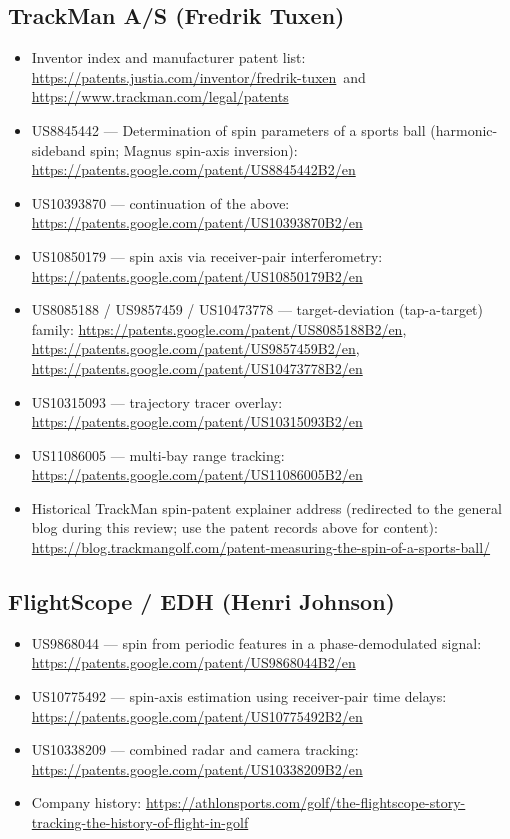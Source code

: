\subsection*{TrackMan A/S (Fredrik Tuxen)}
\begin{itemize}\small
\item Inventor index and manufacturer patent list:
  \url{https://patents.justia.com/inventor/fredrik-tuxen} \,and\,
  \url{https://www.trackman.com/legal/patents}
\item US8845442 --- Determination of spin parameters of a sports ball
  (harmonic-sideband spin; Magnus spin-axis inversion):
  \url{https://patents.google.com/patent/US8845442B2/en}
\item US10393870 --- continuation of the above:
  \url{https://patents.google.com/patent/US10393870B2/en}
\item US10850179 --- spin axis via receiver-pair interferometry:
  \url{https://patents.google.com/patent/US10850179B2/en}
\item US8085188 / US9857459 / US10473778 --- target-deviation
  (tap-a-target) family:
  \url{https://patents.google.com/patent/US8085188B2/en},
  \url{https://patents.google.com/patent/US9857459B2/en},
  \url{https://patents.google.com/patent/US10473778B2/en}
\item US10315093 --- trajectory tracer overlay:
  \url{https://patents.google.com/patent/US10315093B2/en}
\item US11086005 --- multi-bay range tracking:
  \url{https://patents.google.com/patent/US11086005B2/en}
\item Historical TrackMan spin-patent explainer address (redirected to the
  general blog during this review; use the patent records above for content):
  \url{https://blog.trackmangolf.com/patent-measuring-the-spin-of-a-sports-ball/}
\end{itemize}

\subsection*{FlightScope / EDH (Henri Johnson)}
\begin{itemize}\small
\item US9868044 --- spin from periodic features in a phase-demodulated signal:
  \url{https://patents.google.com/patent/US9868044B2/en}
\item US10775492 --- spin-axis estimation using receiver-pair time delays:
  \url{https://patents.google.com/patent/US10775492B2/en}
\item US10338209 --- combined radar and camera tracking:
  \url{https://patents.google.com/patent/US10338209B2/en}
\item Company history:
  \url{https://athlonsports.com/golf/the-flightscope-story-tracking-the-history-of-flight-in-golf}
\end{itemize}

